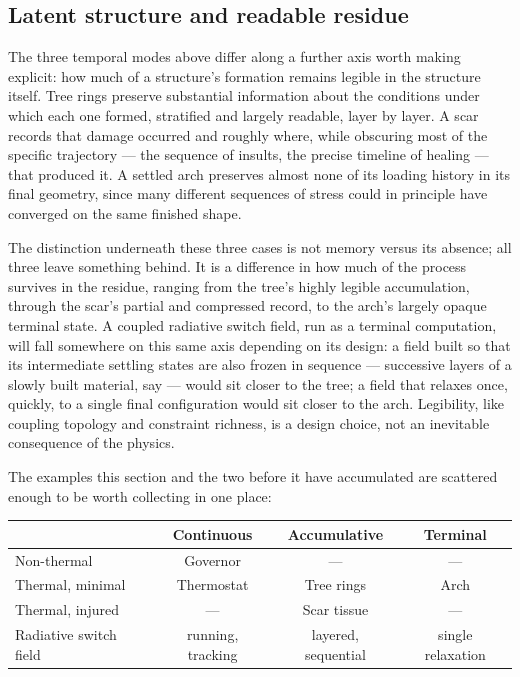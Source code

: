 \documentclass[11pt]{article}
\begin{document}
\subsection{Latent structure and readable residue}

The three temporal modes above differ along a further axis worth making explicit: how much of a structure's formation remains legible in the structure itself. Tree rings preserve substantial information about the conditions under which each one formed, stratified and largely readable, layer by layer. A scar records that damage occurred and roughly where, while obscuring most of the specific trajectory --- the sequence of insults, the precise timeline of healing --- that produced it. A settled arch preserves almost none of its loading history in its final geometry, since many different sequences of stress could in principle have converged on the same finished shape.

The distinction underneath these three cases is not memory versus its absence; all three leave something behind. It is a difference in how much of the process survives in the residue, ranging from the tree's highly legible accumulation, through the scar's partial and compressed record, to the arch's largely opaque terminal state. A coupled radiative switch field, run as a terminal computation, will fall somewhere on this same axis depending on its design: a field built so that its intermediate settling states are also frozen in sequence --- successive layers of a slowly built material, say --- would sit closer to the tree; a field that relaxes once, quickly, to a single final configuration would sit closer to the arch. Legibility, like coupling topology and constraint richness, is a design choice, not an inevitable consequence of the physics.

The examples this section and the two before it have accumulated are scattered enough to be worth collecting in one place:

\begin{center}
\begin{tabular}{lccc}
\hline
& \textbf{Continuous} & \textbf{Accumulative} & \textbf{Terminal} \\
\hline
Non-thermal & Governor & --- & --- \\
Thermal, minimal & Thermostat & Tree rings & Arch \\
Thermal, injured & --- & Scar tissue & --- \\
Radiative switch field & running, tracking & layered, sequential & single relaxation \\
\hline
\end{tabular}
\end{center}
\end{document}
